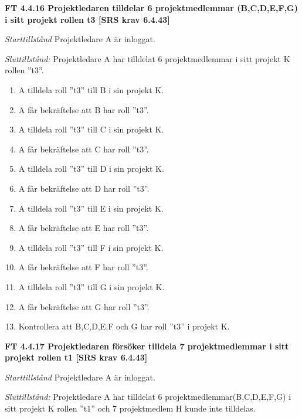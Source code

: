 \documentclass[a4paper]{article}
\begin{document}
\textbf{FT 4.4.16 Projektledaren tilldelar 6 projektmedlemmar (B,C,D,E,F,G) i sitt projekt rollen t3 [SRS krav 6.4.43]}

\emph{Starttillstånd} Projektledare A är inloggat.

\emph{Sluttillstånd:} Projektledare A  har tilldelat 6 projektmedlemmar i sitt projekt K rollen ''t3''.

\begin{enumerate}
\item A tilldela roll ”t3” till B i sin projekt K. 
\item A får bekräftelse att B har roll ”t3”.
\item A tilldela roll ”t3” till C i sin projekt K. 
\item A får bekräftelse att C har roll ”t3”.
\item A tilldela roll ”t3” till D i sin projekt K. 
\item A får bekräftelse att D har roll ”t3”.
\item A tilldela roll ”t3” till E i sin projekt K. 
\item A får bekräftelse att E har roll ”t3”.
\item A tilldela roll ”t3” till F i sin projekt K. 
\item A får bekräftelse att F har roll ”t3”.
\item A tilldela roll ”t3” till G i sin projekt K. 
\item A får bekräftelse att G har roll ”t3”.
\item Kontrollera att B,C,D,E,F och G har roll ”t3” i projekt K.
\end{enumerate}

\textbf{FT 4.4.17 Projektledaren försöker tilldela 7 projektmedlemmar i sitt projekt rollen t1 [SRS krav 6.4.43]}

\emph{Starttillstånd} Projektledare A är inloggat.

\emph{Sluttillstånd:} Projektledare A  har tilldelat 6  projektmedlemmar(B,C,D,E,F,G) i sitt projekt K  rollen ''t1'' och 7 projektmedlem H kunde inte tilldelas.
\end{document}
